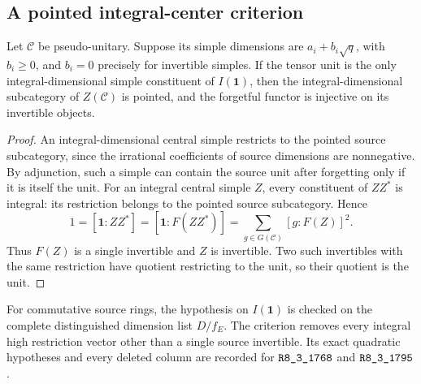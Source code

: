 \subsection{A pointed integral-center criterion}
\begin{proposition}
Let $\mathcal C$ be pseudo-unitary. Suppose its simple dimensions are
$a_i+b_i\sqrt q$, with $b_i\geq0$, and $b_i=0$ precisely for invertible
simples. If the tensor unit is the only integral-dimensional simple
constituent of $I(\mathbf1)$, then the integral-dimensional subcategory
of $Z(\mathcal C)$ is pointed, and the forgetful functor is injective
on its invertible objects.
\end{proposition}
\begin{proof}
An integral-dimensional central simple restricts to the pointed source
subcategory, since the irrational coefficients of source dimensions are
nonnegative. By adjunction, such a simple can contain the source unit
after forgetting only if it is itself the unit. For an integral central
simple $Z$, every constituent of $ZZ^*$ is integral: its restriction
belongs to the pointed source subcategory. Hence
\[
 1=[\mathbf1:ZZ^*]=[\mathbf1:F(ZZ^*)]
   =\sum_{g\in G(\mathcal C)}[g:F(Z)]^2.
\]
Thus $F(Z)$ is a single invertible and $Z$ is invertible. Two such
invertibles with the same restriction have quotient restricting to the
unit, so their quotient is the unit.
\end{proof}
For commutative source rings, the hypothesis on $I(\mathbf1)$ is checked
on the complete distinguished dimension list $D/f_E$. The criterion
removes every integral high restriction vector other than a single
source invertible. Its exact quadratic hypotheses and every deleted
column are recorded for $\sha{R8_3_1768}$ and $\sha{R8_3_1795}$.


